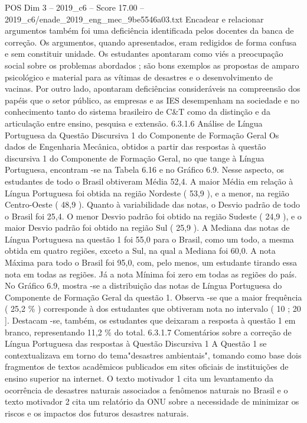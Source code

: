 \begin{textsample}{POS Dim 3 – 2019\_c6 – Score 17.00 – 2019\_c6/enade\_2019\_eng\_mec\_9be5546a03.txt}
Encadear e relacionar argumentos também foi uma deficiência identificada pelos docentes da banca de correção.
Os argumentos, quando apresentados, eram redigidos de forma confusa e sem constituir unidade.
Os estudantes apontaram como viés a preocupação social sobre os problemas abordados ; são bons exemplos as propostas de amparo psicológico e material para as vítimas de desastres e o desenvolvimento de vacinas.
Por outro lado, apontaram deficiências consideráveis na compreensão dos papéis que o setor público, as empresas e as IES desempenham na sociedade e no conhecimento tanto do sistema brasileiro de C\&T como da distinção e da articulação entre ensino, pesquisa e extensão. 6.3.1.6 Análise de Língua Portuguesa da Questão Discursiva 1 do Componente de Formação Geral Os dados de Engenharia Mecânica, obtidos a partir das respostas à questão discursiva 1 do Componente de Formação Geral, no que tange à Língua Portuguesa, encontram -se na Tabela 6.16 e no Gráfico 6.9.
Nesse aspecto, os estudantes de todo o Brasil obtiveram Média 52,4.
A maior Média em relação à Língua Portuguesa foi obtida na região Nordeste ( 53,9 ), e a menor, na região Centro-Oeste ( 48,9 ).
Quanto à variabilidade das notas, o Desvio padrão de todo o Brasil foi 25,4.
O menor Desvio padrão foi obtido na região Sudeste ( 24,9 ), e o maior Desvio padrão foi obtido na região Sul ( 25,9 ).
A Mediana das notas de Língua Portuguesa na questão 1 foi 55,0 para o Brasil, como um todo, a mesma obtida em quatro regiões, exceto a Sul, na qual a Mediana foi 60,0.
A nota Máxima para todo o Brasil foi 95,0, com, pelo menos, um estudante tirando essa nota em todas as regiões.
Já a nota Mínima foi zero em todas as regiões do país.
No Gráfico 6.9, mostra -se a distribuição das notas de Língua Portuguesa do Componente de Formação Geral da questão 1.
Observa -se que a maior frequência ( 25,2 \% ) corresponde à dos estudantes que obtiveram nota no intervalo ( 10 ; 20 ].
Destacam -se, também, os estudantes que deixaram a resposta à questão 1 em branco, representando 11,2 \% do total. 6.3.1.7 Comentários sobre a correção de Língua Portuguesa das respostas à Questão Discursiva 1 A Questão 1 se contextualizava em torno do tema"desastres ambientais", tomando como base dois fragmentos de textos acadêmicos publicados em sites oficiais de instituições de ensino superior na internet.
O texto motivador 1 cita um levantamento da ocorrência de desastres naturais associados a fenômenos naturais no Brasil e o texto motivador 2 cita um relatório da ONU sobre a necessidade de minimizar os riscos e os impactos dos futuros desastres naturais.

\end{textsample}
